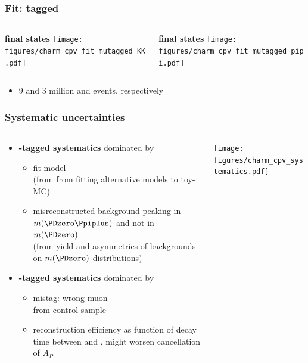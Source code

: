 \documentclass[18pt, aspectratio=169]{beamer}
\begin{document}
\begin{frame}
  \frametitle{Fit: \Pmu tagged}
  \begin{columns}
    \begin{column}{.5\textwidth}
      \centering
      \textbf{\PKplus\PKminus final states}
      \texttt{[image: figures/charm\_cpv\_fit\_mutagged\_KK.pdf]}
    \end{column}

    \begin{column}{.5\textwidth}
      \centering
            \textbf{\Ppiplus\Ppiminus final states}
      \texttt{[image: figures/charm\_cpv\_fit\_mutagged\_pipi.pdf]}
    \end{column}
  \end{columns}
    \begin{itemize}
  \item 9 and 3 million \PKplus\PKminus and \Ppiplus\Ppiminus events, respectively
  \end{itemize}
\end{frame}

\begin{frame}
  \frametitle{Systematic uncertainties}
  \begin{columns}
    \begin{column}{.5\textwidth}
      \begin{itemize}
      \item \textbf{\Ppi-tagged systematics} dominated by
        \begin{itemize}
        \item fit model\\
          (from from fitting alternative models to toy-MC)
        \item misreconstructed background peaking in $m(\PDzero\Ppiplus)$ and not in $m(\PDzero)$\\
          (from yield and asymmetries of backgrounds on $m(\PDzero)$ distributions)
        \end{itemize}
      \item \textbf{\Pmu-tagged systematics} dominated by
        \begin{itemize}
        \item mistag: wrong muon\\
          from \PKminus\Ppiplus control sample
        \item \PB reconstruction efficiency as function of decay time between \PKplus\PKminus and
          \Ppiplus\Ppiminus, might worsen cancellation of $A_P$
        \end{itemize}
      \end{itemize}
    \end{column}

    \begin{column}{.5\textwidth}
      \texttt{[image: figures/charm\_cpv\_systematics.pdf]}
    \end{column}
  \end{columns}
\end{frame}
\end{document}
